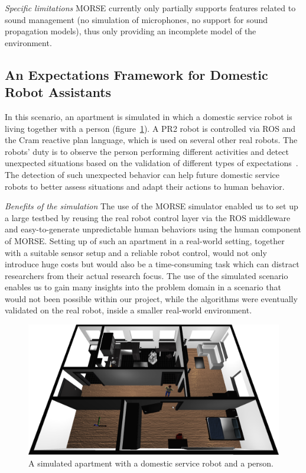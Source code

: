 \documentclass{llncs}
\begin{document}
\emph{Specific limitations} MORSE currently only partially supports features
related to sound management (no simulation of microphones, no support for sound
propagation models), thus only providing an incomplete model of the environment.

\subsection{An Expectations Framework for Domestic Robot Assistants}
\label{sc:expectations}

In this scenario, an apartment is simulated in which a domestic service robot is
living together with a person (figure~\ref{fig|apartment}).  A PR2 robot is
controlled via ROS and the {\sc Cram} reactive plan language, which is used on
several other real robots. The robots' duty is to observe the person performing
different activities and detect unexpected situations based on the validation of
different types of expectations~\cite{Karg2013}.  The detection of such
unexpected behavior can help future domestic service robots to better assess
situations and adapt their actions to human behavior.

\emph{Benefits of the simulation} The use of the MORSE simulator enabled us to
set up a large testbed by reusing the real robot control layer via the ROS
middleware and easy-to-generate unpredictable human behaviors using the human
component of MORSE. Setting up of such an apartment in a real-world setting,
together with a suitable sensor setup and a reliable robot control, would not
only introduce huge costs but would also be a time-consuming task which can
distract researchers from their actual research focus. The use of the simulated
scenario enables us to gain many insights into the problem domain in a scenario
that would not been possible within our project, while the algorithms were
eventually validated on the real robot, inside a smaller real-world environment.

\begin{figure}[t]
      \centering
      \includegraphics[width=0.7\linewidth]{morse_apartment.png}
      \caption{A simulated apartment with a domestic service robot and a person.}
      \label{fig|apartment}
\end{figure}
\end{document}

